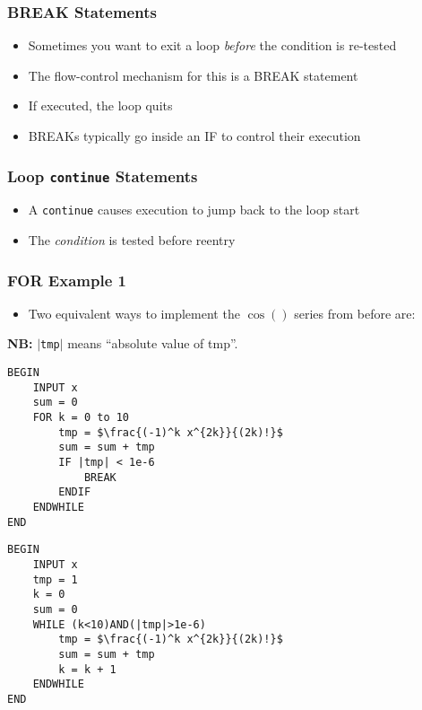 \documentclass[14pt]{beamer}
\begin{document}
\begin{frame}
\frametitle{BREAK Statements}
\begin{itemize}
\item Sometimes you want to exit a loop \textit{before} the condition is re-tested
\item The flow-control mechanism for this is a BREAK statement
\item If executed, the loop quits
\item BREAKs typically go inside an IF to control their execution
\end{itemize}
\end{frame}

\begin{frame}
\frametitle{Loop \texttt{continue} Statements}
\begin{itemize}
	\item A \texttt{continue} causes execution to jump back to the loop start
	\item The \textit{condition} is tested before reentry	
\end{itemize}
\end{frame}

\begin{frame}[fragile]
\frametitle{FOR Example 1}
\begin{itemize}
\item Two equivalent ways to implement the $\cos()$ series from before are:
\end{itemize}
{\small\textbf{NB:} $|$\texttt{tmp}$|$ means ``absolute value of tmp''.}
\begin{multicols}{2}
\begin{lstlisting}[style=pseudo,mathescape=true,basicstyle=\ttfamily\scriptsize]
BEGIN
	INPUT x
	sum = 0
	FOR k = 0 to 10
		tmp = $\frac{(-1)^k x^{2k}}{(2k)!}$
		sum = sum + tmp
		IF |tmp| < 1e-6
			BREAK
		ENDIF
	ENDWHILE 
END
\end{lstlisting}
\columnbreak
\begin{lstlisting}[style=pseudo,mathescape=true,basicstyle=\ttfamily\scriptsize]
BEGIN
	INPUT x
	tmp = 1
	k = 0
	sum = 0
	WHILE (k<10)AND(|tmp|>1e-6)
		tmp = $\frac{(-1)^k x^{2k}}{(2k)!}$
		sum = sum + tmp
		k = k + 1
	ENDWHILE 
END
\end{lstlisting}

\end{multicols}
\end{frame}
\end{document}

